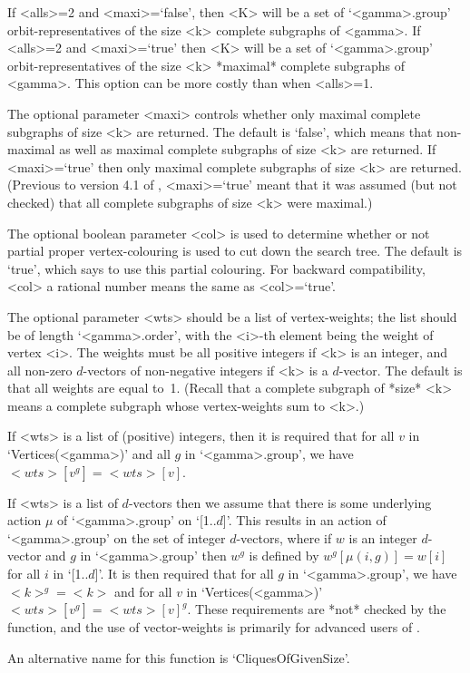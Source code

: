 If <alls>=2 and <maxi>=`false', then <K> will be a set of `<gamma>.group'
orbit-representatives of the size <k> complete subgraphs of <gamma>.
If <alls>=2 and <maxi>=`true' then <K> will be a set of `<gamma>.group'
orbit-representatives of the size <k> *maximal* complete subgraphs
of <gamma>.  This option can be more costly than when <alls>=1.

The optional parameter <maxi> controls whether only maximal complete
subgraphs of size <k> are returned.  The default is `false', which means
that non-maximal as well as maximal complete subgraphs of size <k> are
returned. If <maxi>=`true' then only maximal complete subgraphs of size
<k> are returned. (Previous to version 4.1 of {\GRAPE}, <maxi>=`true'
meant that it was assumed (but not checked) that all complete subgraphs
of size <k> were maximal.)

The optional boolean parameter <col> is used to determine whether or not
partial proper vertex-colouring is used to cut down the search tree. The
default is `true', which says to use this partial colouring.  For backward
compatibility, <col> a rational number means the same as <col>=`true'.

The optional parameter <wts> should be a list of vertex-weights; the list
should be of length `<gamma>.order', with the <i>-th element being the
weight of vertex <i>. The weights must be all positive integers if <k>
is an integer, and all non-zero $d$-vectors of non-negative integers
if <k> is a $d$-vector. The default is that all weights are equal to~1.
(Recall that a complete subgraph of *size* <k> means a complete subgraph
whose vertex-weights sum to <k>.)

If <wts> is a list of (positive) integers, then it is required that for
all $v$ in `Vertices(<gamma>)' and all $g$ in `<gamma>.group', we have
$<wts>[v^g]=<wts>[v]$.

If <wts> is a list of $d$-vectors then we assume that there is some
underlying action $\mu$ of `<gamma>.group' on `[1..$d$]'. This results
in an action of `<gamma>.group' on the set of integer $d$-vectors, where
if $w$ is an integer $d$-vector and $g$ in `<gamma>.group' then $w^g$
is defined by $w^g[\mu(i,g)]=w[i]$ for all $i$ in `[1..$d$]'. It is
then required that for all $g$ in `<gamma>.group', we have $<k>^g=<k>$
and for all $v$ in `Vertices(<gamma>)' $<wts>[v^g] = <wts>[v]^g$.
These requirements are *not* checked by the function, and the use of
vector-weights is primarily for advanced users of {\GRAPE}.

An alternative name for this function is 
`CliquesOfGivenSize'.

